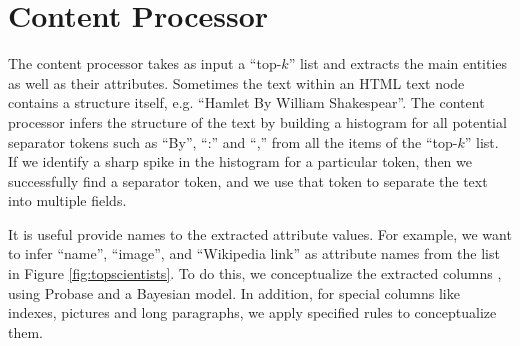 \section{Content Processor}
The content processor takes as input a ``top-$k$'' list and
extracts the main entities as well
as their attributes.
Sometimes the text within an HTML text node contains a structure itself, e.g.
``Hamlet By William Shakespear''. The content processor infers the structure of
the text \cite{Fisher08:dirttoshovels} by building a histogram for
all potential separator tokens such as ``By'', ``:'' and ``,'' from all the items
of the ``top-$k$'' list. If we identify a sharp spike in the histogram for a
particular token, then we successfully find a separator token, and we use that
token to separate the text into multiple fields.

It is useful provide names to the extracted attribute values. For example,
we want to infer ``name'', ``image'', and ``Wikipedia link'' as
attribute names from the list in Figure \ref{fig:topscientists}.
To do this, we conceptualize the extracted columns \cite{Song11:Conceptualize},
using Probase and a Bayesian model.
In addition, for special columns like indexes, pictures and long paragraphs,
we apply specified rules to conceptualize them.

